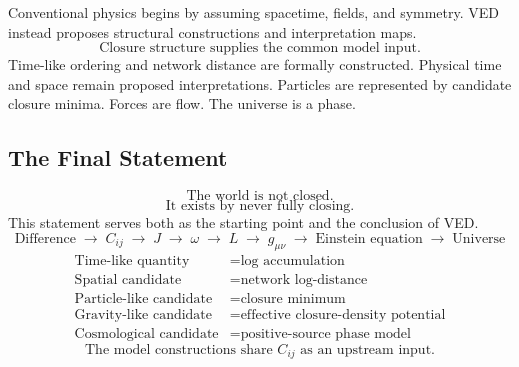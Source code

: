 Conventional physics begins by assuming spacetime, fields, and symmetry.
VED instead proposes structural constructions and interpretation maps.
\begin{equation}
  \boxed{\text{Closure structure supplies the common model input.}}
\end{equation}
Time-like ordering and network distance are formally constructed.
Physical time and space remain proposed interpretations.
Particles are represented by candidate closure minima.
Forces are flow.
The universe is a phase.

\subsection{The Final Statement}

\begin{equation}
  \boxed{\text{The world is not closed.}}
\end{equation}
\begin{equation}
  \boxed{\text{It exists by never fully closing.}}
\end{equation}
This statement serves both as the starting point and the conclusion of VED.
\begin{equation}
  \text{Difference}
  \;\to\; C_{ij}
  \;\to\; J
  \;\to\; \omega
  \;\to\; L
  \;\to\; g_{\mu\nu}
  \;\to\; \text{Einstein equation}
  \;\to\; \text{Universe}
\end{equation}
\begin{equation}
  \boxed{\begin{aligned}
    \text{Time-like quantity} &= \text{log accumulation} \\
    \text{Spatial candidate}  &= \text{network log-distance} \\
    \text{Particle-like candidate} &= \text{closure minimum} \\
    \text{Gravity-like candidate}  &= \text{effective closure-density potential} \\
    \text{Cosmological candidate} &= \text{positive-source phase model}
  \end{aligned}}
\end{equation}
\begin{equation}
  \boxed{\text{The model constructions share } C_{ij} \text{ as an upstream input.}}
\end{equation}
